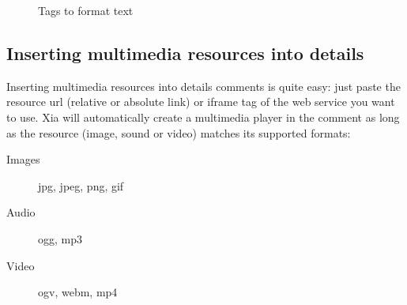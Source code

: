 \begin{figure}[htp!]
\caption{Tags to format text}
\label{xia_text_tags}
\end{figure}

\subsection{Inserting multimedia resources into details}\label{enrichissement_multimedia}

Inserting multimedia resources into details comments is quite easy: just paste 
the resource url (relative or absolute link) or iframe tag of the web service 
you want to use. Xia will automatically create a multimedia player in the comment as long as 
the resource (image, sound or video) matches its supported formats: 
\begin{description}
 \item [Images] jpg, jpeg, png, gif
 \item [Audio] ogg, mp3
 \item [Video] ogv, webm, mp4
\end{description}

